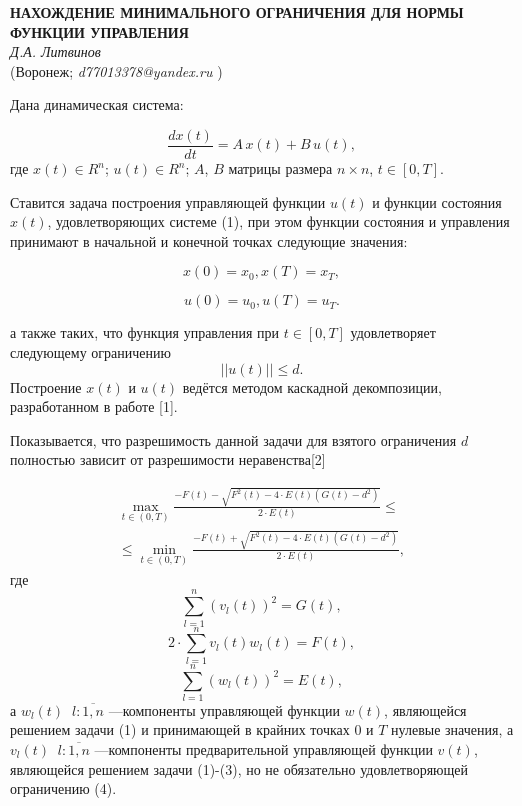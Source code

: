 \begin{center}{ \bf  НАХОЖДЕНИЕ МИНИМАЛЬНОГО ОГРАНИЧЕНИЯ ДЛЯ НОРМЫ ФУНКЦИИ УПРАВЛЕНИЯ}\\
{\it Д.А. Литвинов } \\
(Воронеж; {\it d77013378@yandex.ru} )
\end{center}


Дана  динамическая система:

\begin{equation}
\frac{dx(t)}{dt}=A\, x(t)+B\, u(t),
\end{equation}
где $x(t)\in R^{n}$;
$u(t)\in R^{n}$;
$A$, $B$ матрицы размера $n\times n
$,  $t\in [0,T]$.

Ставится задача построения  управляющей функции $u(t)$ и функции состояния $x(t)$, удовлетворяющих системе (1), при этом  функции состояния и управления  принимают в начальной и конечной точках следующие  значения:

\begin{equation}
x(0)=x_{0},x(T)=x_{T},
\end{equation}

\begin{equation}
u(0)=u_{0},u(T)=u_{T}.
\end{equation}

а также таких, что функция управления при $t\in [0,T]$ удовлетворяет следующему ограничению
\begin{equation}
||u(t)||\leqslant d.
\end{equation}
 Построение $x(t)$ и $u(t)$ ведётся методом каскадной декомпозиции, разработанном в работе [1].

Показывается, что разрешимость данной задачи для взятого ограничения $d$ полностью зависит от разрешимости  неравенства[2]

\begin{multline}
\max\limits_{t\in(0,T)}\frac{-F(t)-\sqrt{F^{2}(t)-4\cdot E(t)(G(t)-d^{2})}}{2\cdot E(t)}
\leqslant
\\ \leqslant
\min\limits_{t\in(0,T)}\frac{-F(t)+\sqrt{F^{2}(t)-4\cdot E(t)(G(t)-d^{2})}}{2\cdot E(t)},
\end{multline}
где $$\sum\limits_{l=1}^{n}(v_{l}(t))^{2}=G(t),$$
$$2\cdot\sum\limits_{l=1}^{n}v_{l}(t)w_{l}(t)=F(t),$$
$$\sum\limits_{l=1}^{n}(w_{l}(t))^{2}=E(t),$$
а $w_{l}(t)\;\;l:\overline{1,n}$ ---компоненты управляющей  функции $w(t)$, являющейся решением задачи (1) и принимающей в крайних точках 0 и $T$ нулевые значения, а $v_{l}(t)\;\;l:\overline{1,n}$ ---компоненты предварительной управляющей  функции $v(t)$, являющейся решением задачи (1)-(3), но не обязательно удовлетворяющей ограничению (4).


